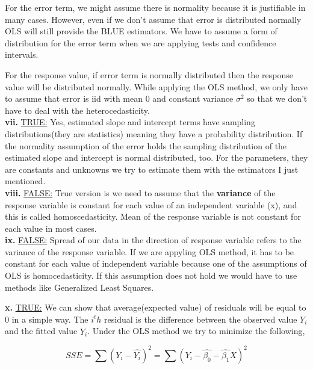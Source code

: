 \documentclass{article}
\begin{document}
For the error term, we might assume there is normality because it is justifiable in many cases. However, even if we don't assume that error is distributed normally OLS will still provide the BLUE estimators. We have to assume a form of distribution for the error term when we are applying tests and confidence intervals. 

For the response value, if error term is normally distributed  then the response value will be distributed normally. While applying the OLS method, we only have to assume that error is iid with mean 0 and constant variance $\sigma^2$ so that we don't have to deal with the heterocedasticity.
\\

\textbf{vii.} \underline{TRUE:} Yes, estimated slope and intercept terms have sampling distributions(they are statistics) meaning they have a probability distribution. If the normality assumption of the error holds the sampling distribution of the estimated slope and intercept is normal distributed, too. For the parameters, they are constants and unknowns we try to estimate them with the estimators I just mentioned.
\\

\textbf{viii.} \underline{FALSE:} True version is we need to assume that the \textbf{variance} of the response variable is constant for each value of an independent variable (x), and this is called homoscedasticity. Mean of the response variable is not constant for each value in most cases.
\\

\textbf{ix.} \underline{FALSE:} Spread of our data in the direction of response variable refers to the variance of the response variable. If we are appyling OLS method, it has to be constant for each value of independent variable because one of the assumptions of OLS is homocedasticity. If this assumption does not hold we would have to use methods like Generalized Least Squares.

\newpage

\textbf{x.} \underline{TRUE:} We can show that average(expected value) of residuals will be equal to 0 in a simple way. The $i^th$ residual is the difference between the observed value $Y_i$ and the fitted value $\hat{Y_i}$. Under the OLS method we try to minimize the following,

\begin{equation}
SSE = \sum (Y_i - \hat{Y_i})^2 = \sum (Y_i - \hat{\beta_0} - \hat{\beta_1}X)^2
\end{equation}
\end{document}
